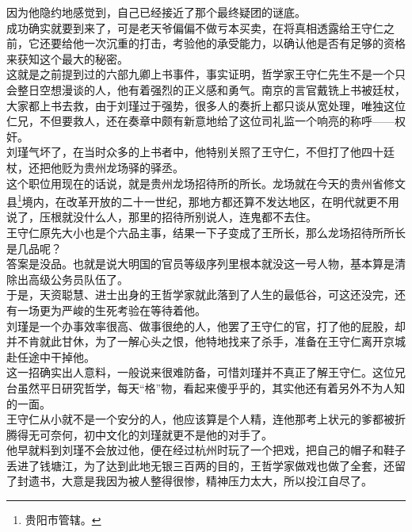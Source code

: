 \begin{multicols}{\theparacolNo}
因为他隐约地感觉到，自己已经接近了那个最终疑团的谜底。\\

成功确实就要到来了，可是老天爷偏偏不做亏本买卖，在将真相透露给王守仁之前，它还要给他一次沉重的打击，考验他的承受能力，以确认他是否有足够的资格来获知这个最大的秘密。\\

这就是之前提到过的六部九卿上书事件，事实证明，哲学家王守仁先生不是一个只会整日空想漫谈的人，他有着强烈的正义感和勇气。南京的言官戴铣上书被廷杖，大家都上书去救，由于刘瑾过于强势，很多人的奏折上都只谈从宽处理，唯独这位仁兄，不但要救人，还在奏章中颇有新意地给了这位司礼监一个响亮的称呼——权奸。\\

刘瑾气坏了，在当时众多的上书者中，他特别关照了王守仁，不但打了他四十廷杖，还把他贬为贵州龙场驿的驿丞。\\

这个职位用现在的话说，就是贵州龙场招待所的所长。龙场就在今天的贵州省修文县\footnote{贵阳市管辖。}境内，在改革开放的二十一世纪，那地方都还算不发达地区，在明代就更不用说了，压根就没什么人，那里的招待所别说人，连鬼都不去住。\\

王守仁原先大小也是个六品主事，结果一下子变成了王所长，那么龙场招待所所长是几品呢？\\

答案是没品。也就是说大明国的官员等级序列里根本就没这一号人物，基本算是清除出高级公务员队伍了。\\

于是，天资聪慧、进士出身的王哲学家就此落到了人生的最低谷，可这还没完，还有一场更为严峻的生死考验在等待着他。\\

刘瑾是一个办事效率很高、做事很绝的人，他罢了王守仁的官，打了他的屁股，却并不肯就此甘休，为了一解心头之恨，他特地找来了杀手，准备在王守仁离开京城赴任途中干掉他。\\

这一招确实出人意料，一般说来很难防备，可惜刘瑾并不真正了解王守仁。这位兄台虽然平日研究哲学，每天“格”物，看起来傻乎乎的，其实他还有着另外不为人知的一面。\\

王守仁从小就不是一个安分的人，他应该算是个人精，连他那考上状元的爹都被折腾得无可奈何，初中文化的刘瑾就更不是他的对手了。\\

他早就料到刘瑾不会放过他，便在经过杭州时玩了一个把戏，把自己的帽子和鞋子丢进了钱塘江，为了达到此地无银三百两的目的，王哲学家做戏也做了全套，还留了封遗书，大意是我因为被人整得很惨，精神压力太大，所以投江自尽了。\\


\end{multicols}
